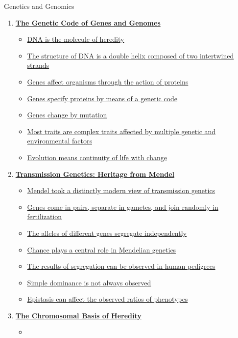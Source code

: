 \documentclass[12pt,letterpaper]{article}
\begin{document}
\begin{chapbox}{Genetics and Genomics}{ 
\begin{enumerate}[font=\bfseries, wide]
\item \hyperlink{1}{\textbf{The Genetic Code of Genes and Genomes}}
    \begin{itemize}
        \item \hyperlink{1.1}{DNA is the molecule of heredity}
        \item \hyperlink{1.2}{The structure of DNA is a double helix composed of two intertwined strands}
        \item \hyperlink{1.3}{Genes affect organisms through the action of proteins}
        \item \hyperlink{1.4}{Genes specify proteins by means of a genetic code}
        \item \hyperlink{1.5}{Genes change by mutation}
        \item \hyperlink{1.6}{Most traits are complex traits affected by multiple genetic and environmental factors}
        \item \hyperlink{1.7}{Evolution means continuity of life with change}
    \end{itemize}
    \item \hyperlink{2}{\textbf{Transmission Genetics: Heritage from Mendel}}
    \begin{itemize}
        \item \hyperlink{2.1}{Mendel took a distinctly modern view of transmission genetics}
        \item \hyperlink{2.2}{Genes come in pairs, separate in gametes, and join randomly in fertilization}
        \item \hyperlink{2.3}{The alleles of different genes segregate independently}
        \item \hyperlink{2.4}{Chance plays a central role in Mendelian genetics}
        \item \hyperlink{2.5}{The results of segregation can be observed in human pedigrees}
        \item \hyperlink{2.6}{Simple dominance is not always observed}
        \item \hyperlink{2.7}{Epistasis can affect the observed ratios of phenotypes}
    \end{itemize}
    \item \hyperlink{3}{\textbf{The Chromosomal Basis of Heredity}}
    \begin{itemize}
        \item 

\end{itemize}
\end{enumerate}}
\end{chapbox}
\end{document}
